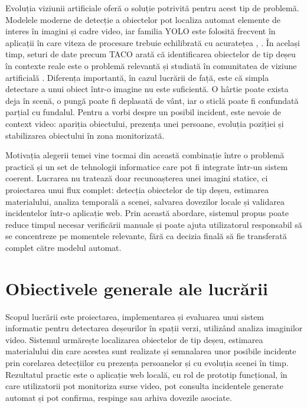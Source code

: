 Evoluția viziunii artificiale oferă o soluție potrivită pentru acest tip de problemă. Modelele moderne de detecție a obiectelor pot localiza automat elemente de interes în imagini și cadre video, iar familia YOLO este folosită frecvent în aplicații în care viteza de procesare trebuie echilibrată cu acuratețea \cite{redmon2016yolo}, \cite{ultralytics2023yolov8}. În același timp, seturi de date precum TACO arată că identificarea obiectelor de tip deșeu în contexte reale este o problemă relevantă și studiată în comunitatea de viziune artificială \cite{proenca2020taco}. Diferența importantă, în cazul lucrării de față, este că simpla detectare a unui obiect într-o imagine nu este suficientă. O hârtie poate exista deja în scenă, o pungă poate fi deplasată de vânt, iar o sticlă poate fi confundată parțial cu fundalul. Pentru a vorbi despre un posibil incident, este nevoie de context video: apariția obiectului, prezența unei persoane, evoluția poziției și stabilizarea obiectului în zona monitorizată.

Motivația alegerii temei vine tocmai din această combinație între o problemă practică și un set de tehnologii informatice care pot fi integrate într-un sistem coerent. Lucrarea nu tratează doar recunoașterea unei imagini statice, ci proiectarea unui flux complet: detecția obiectelor de tip deșeu, estimarea materialului, analiza temporală a scenei, salvarea dovezilor locale și validarea incidentelor într-o aplicație web. Prin această abordare, sistemul propus poate reduce timpul necesar verificării manuale și poate ajuta utilizatorul responsabil să se concentreze pe momentele relevante, fără ca decizia finală să fie transferată complet către modelul automat.

\section*{Obiectivele generale ale lucrării}
{}

Scopul lucrării este proiectarea, implementarea și evaluarea unui sistem informatic pentru detectarea deșeurilor în spații verzi, utilizând analiza imaginilor video. Sistemul urmărește localizarea obiectelor de tip deșeu, estimarea materialului din care acestea sunt realizate și semnalarea unor posibile incidente prin corelarea detecțiilor cu prezența persoanelor și cu evoluția scenei în timp. Rezultatul practic este o aplicație web locală, cu rol de prototip funcțional, în care utilizatorii pot monitoriza surse video, pot consulta incidentele generate automat și pot confirma, respinge sau arhiva dovezile asociate.

